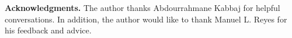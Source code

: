 \documentclass[reqno]{amsart}
\numberwithin{equation}{section}
\theoremstyle{plain}
\theoremstyle{definition}
\begin{document}




\textbf{Acknowledgments.} The author thanks Abdourrahmane Kabbaj for helpful conversations. In addition, the author would like to thank Manuel L. Reyes for his feedback and advice. 



\end{document}
